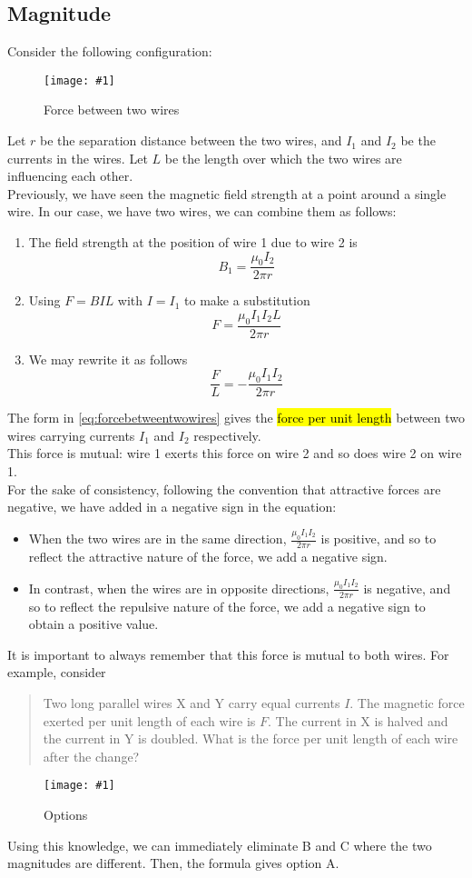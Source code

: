 \documentclass[a4paper,12pt]{article}
\newcommand{\lb}{\\[8pt]}
\newcommand{\img}[4]{\begin{center}
  \begin{figure}[H]
    \centering
    \texttt{[image: \#1]}
    \caption{#3}
    \label{fig:#4}
  \end{figure}
\end{center}}
\begin{document}
\subsection{Magnitude}
Consider the following configuration:
\img{twowireforce.png}{0.45}{Force between two wires}{twowireforce}
Let $r$ be the separation distance between the two wires, and $I_1$ and $I_2$ be the currents in the wires. Let $L$ be the length over which the two wires are influencing each other.\lb
Previously, we have seen the magnetic field strength at a point around a single wire. In our case, we have two wires, we can combine them as follows:
\begin{enumerate}
  \item The field strength at the position of wire 1 due to wire 2 is $$B_1 = \frac{\mu_0I_2}{2\pi r}$$
  \item Using $F = BIL$ with $I = I_1$ to make a substitution
        $$F = \frac{\mu_0I_1I_2L}{2\pi r}$$
  \item We may rewrite it as follows
        \begin{equation}\label{eq:forcebetweentwowires}
          \frac{F}{L} = -\frac{\mu_0I_1I_2}{2\pi r}
        \end{equation}
\end{enumerate}
The form in \cref{eq:forcebetweentwowires} gives the \hl{force per unit length} between two wires carrying currents $I_1$ and $I_2$ respectively.\lb
This force is mutual: wire 1 exerts this force on wire 2 and so does wire 2 on wire 1.\lb
For the sake of consistency, following the convention that attractive forces are negative, we have added in a negative sign in the equation:
\begin{itemize}
  \item When the two wires are in the same direction, $\frac{\mu_0I_1I_2}{2\pi r}$ is positive, and so to reflect the attractive nature of the force, we add a negative sign.
  \item In contrast, when the wires are in opposite directions, $\frac{\mu_0I_1I_2}{2\pi r}$ is negative, and so to reflect the repulsive nature of the force, we add a negative sign to obtain a positive value.
\end{itemize}

It is important to always remember that this force is mutual to both wires. For example, consider
\begin{quote}
  Two long parallel wires X and Y carry equal currents $I$. The magnetic force exerted per unit length of each wire is $F$.
  The current in X is halved and the current in Y is doubled. What is the force per unit length of each wire after the change?
\end{quote}
\img{ex/forceismutual.png}{0.8}{Options}{forceismutual}
Using this knowledge, we can immediately eliminate B and C where the two magnitudes are different. Then, the formula gives option A.
\end{document}
